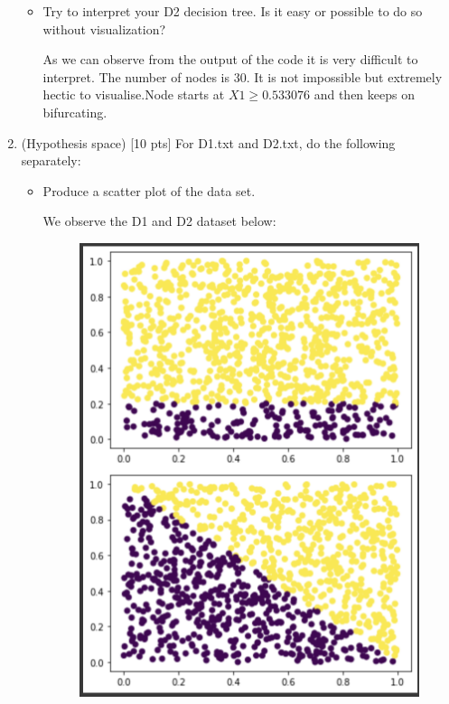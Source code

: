 \documentclass[a4paper]{article}
\theoremstyle{definition}
\newenvironment{soln}{
    \leavevmode\color{blue}\ignorespaces
}{}
\begin{document}
\begin{enumerate}
\begin{itemize}
  \item Try to interpret your D2 decision tree. Is it easy or possible to do so without visualization? \\
  \begin{soln}
      As we can observe from the output of the code it is very difficult to interpret. The number of nodes is 30. It is not impossible but extremely hectic to visualise.Node starts at $X1 \ge0.533076$ and then keeps on bifurcating.
  \end{soln}
  
  \end{itemize}

\item (Hypothesis space)  [10 pts] For D1.txt and D2.txt, do the following separately:
  \begin{itemize}
  
  \item Produce a scatter plot of the data set.
  \begin{soln}
      We observe the D1 and D2 dataset below:\\
       \begin{figure}[H]
            \centering
            \includegraphics[scale=0.5]{datatrain.png}
            \label{fig:q2}
        \end{figure}
  \end{soln}


\end{itemize}
\end{enumerate}
\end{document}
